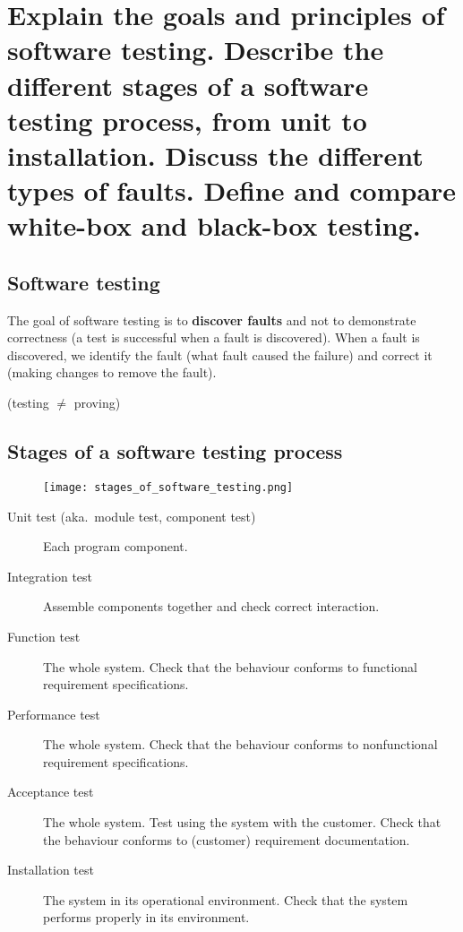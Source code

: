 \clearpage{}
\section{Explain the goals and principles of software testing. Describe the
different stages of a software testing process, from unit to installation.
Discuss the different types of faults. Define and compare white-box and
black-box testing.}


\subsection{Software testing}

The goal of software testing is to \textbf{discover faults} and not to
demonstrate correctness (a test is successful when a fault is
discovered). When a fault is discovered, we identify the fault (what
fault caused the failure) and correct it (making changes to remove the
fault).

(testing $\neq$ proving)

\subsection{Stages of a software testing process}

\begin{figure}[!ht]
    \centering
    \texttt{[image: stages\_of\_software\_testing.png]}
\end{figure}

\begin{description}
    \item[Unit test (aka.\ module test, component test)]
    Each program component.
    \item[Integration test]
    Assemble components together and check correct interaction.
    \item[Function test]
    The whole system.
    Check that the behaviour conforms to functional requirement specifications.
    \item[Performance test]
    The whole system.
    Check that the behaviour conforms to nonfunctional requirement specifications.
    \item[Acceptance test]
    The whole system.
    Test using the system with the customer.
    Check that the behaviour conforms to (customer) requirement documentation.
    \item[Installation test]
    The system in its operational environment.
    Check that the system performs properly in its environment.
\end{description}


